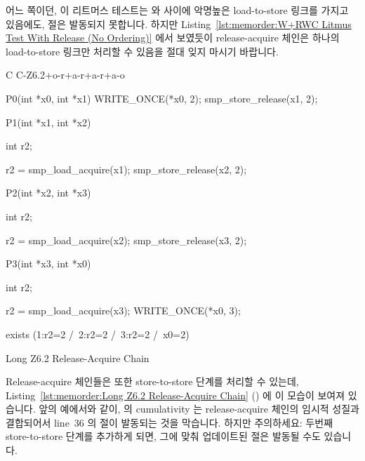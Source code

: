 어느 쪽이던, 이 리트머스 테스트는  와  사이에 악명높은
load-to-store 링크를 가지고 있음에도,  절은 발동되지 못합니다.
하지만
Listing~\ref{lst:memorder:W+RWC Litmus Test With Release (No Ordering)}
에서 보였듯이 release-acquire 체인은 하나의 load-to-store 링크만 처리할 수
있음을 절대 잊지 마시기 바랍니다.

\begin{listing}[tbp]
{ \scriptsize
\begin{verbbox}[\LstLineNo]
C C-Z6.2+o-r+a-r+a-r+a-o
{
}

P0(int *x0, int *x1)
{
  WRITE_ONCE(*x0, 2);
  smp_store_release(x1, 2);
}


P1(int *x1, int *x2)
{
  int r2;

  r2 = smp_load_acquire(x1);
  smp_store_release(x2, 2);
}

P2(int *x2, int *x3)
{
  int r2;

  r2 = smp_load_acquire(x2);
  smp_store_release(x3, 2);
}

P3(int *x3, int *x0)
{
  int r2;

  r2 = smp_load_acquire(x3);
  WRITE_ONCE(*x0, 3);
}

exists (1:r2=2 /\ 2:r2=2 /\ 3:r2=2 /\ x0=2)
\end{verbbox}
}
\centering
\theverbbox
\caption{Long Z6.2 Release-Acquire Chain}
\label{lst:memorder:Long Z6.2 Release-Acquire Chain}
\end{listing}

Release-acquire 체인들은 또한 store-to-store 단계를 처리할 수 있는데,
Listing~\ref{lst:memorder:Long Z6.2 Release-Acquire Chain}
()
에 이 모습이 보여져 있습니다.
앞의 예에서와 같이,  의 cumulativity 는 release-acquire
체인의 임시적 성질과 결합되어서 line~36 의  절이 발동되는 것을
막습니다.
하지만 주의하세요: 두번째 store-to-store 단계를 추가하게 되면, 그에 맞춰
업데이트된  절은 발동될 수도 있습니다.

